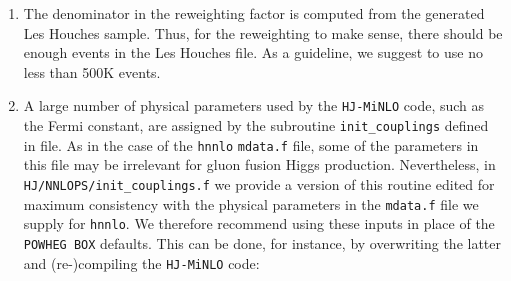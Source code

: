 \documentclass[11pt,a4paper]{article}
\newcommand{\noun}[1]{{\tt #1}}
\newcommand{\POWHEGBOX}{\noun{POWHEG BOX}}
\newcommand{\HJMINLO}{\noun{HJ-MiNLO}}
\newcommand{\HNNLO}{\noun{hnnlo}}
\begin{document}
\begin{enumerate}
\item  The denominator in the reweighting factor is computed from the
       generated Les Houches sample. Thus, for the reweighting to make
       sense, there should be enough events in the Les Houches file.
       As a guideline, we suggest to use no less than 500K events.
\item  A large number of physical parameters used by the \HJMINLO{} code,
  such as the Fermi constant, are assigned by the subroutine
  {\tt{init\_couplings}}
  defined in file. As in the case of
  the \HNNLO{} {\tt{mdata.f}} file, some of the parameters in this file may
  be irrelevant for gluon fusion Higgs production. 
  Nevertheless, in {\tt{HJ/NNLOPS/init\_couplings.f}} we provide
  a version of this routine edited for maximum consistency with the physical
  parameters in the {\tt{mdata.f}} file we supply for \HNNLO{}. We therefore
  recommend using these inputs in place of the \POWHEGBOX{} defaults. This
  can be done, for instance, by overwriting the latter and (re-)compiling the \HJMINLO{}
  code:
  \vspace{3mm}\\
  \\
  \\


\end{enumerate}
\end{document}
